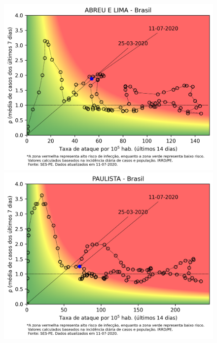 \documentclass[]{article}
\begin{document}
\begin{figure}[!h]
	\begin{minipage}[t]{4cm}
	\centering
	\includegraphics[scale=0.5]{../ABREU E LIMA.png}
\end{minipage}
\hspace{5cm}
\begin{minipage}[t]{4cm}
	\centering
	\includegraphics[scale=0.5]{../PAULISTA.png}
	\vspace{0.2cm}
\end{minipage}
\end{figure}
\newpage
\end{document}
